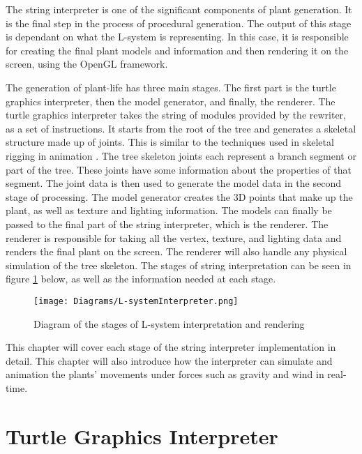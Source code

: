 
\lettrine[lines=3]{T}{}he string interpreter is one of the significant components of plant generation. It is the final step in the process of procedural generation. The output of this stage is dependant on what the L-system is representing. In this case, it is responsible for creating the final plant models and information and then rendering it on the screen, using the OpenGL framework. 

The generation of plant-life has three main stages. The first part is the turtle graphics interpreter, then the model generator, and finally, the renderer. The turtle graphics interpreter takes the string of modules provided by the rewriter, as a set of instructions. It starts from the root of the tree and generates a skeletal structure made up of joints. This is similar to the techniques used in skeletal rigging in animation \cite{gregory2014game}. The tree skeleton joints each represent a branch segment or part of the tree. These joints have some information about the properties of that segment. The joint data is then used to generate the model data in the second stage of processing. The model generator creates the 3D points that make up the plant, as well as texture and lighting information. The models can finally be passed to the final part of the string interpreter, which is the renderer. The renderer is responsible for taking all the vertex, texture, and lighting data and renders the final plant on the screen. The renderer will also handle any physical simulation of the tree skeleton. The stages of string interpretation can be seen in figure \ref{l-system interpreter} below, as well as the information needed at each stage. 

\begin{figure}[htbp]
	{\centering
		\vspace{7px}
		\texttt{[image: Diagrams/L-systemInterpreter.png]}
		\caption{Diagram of the stages of L-system interpretation and rendering} \label{l-system interpreter}
	}
\end{figure}
\FloatBarrier

\noindent
This chapter will cover each stage of the string interpreter implementation in detail. This chapter will also introduce how the interpreter can simulate and animation the plants' movements under forces such as gravity and wind in real-time. 

\section{Turtle Graphics Interpreter}

